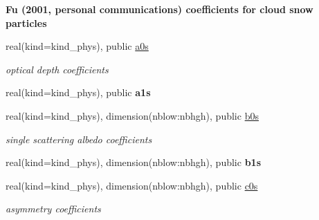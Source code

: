 \begin{Indent}\textbf{ Fu (2001, personal communications) coefficients for cloud snow particles}\par
\begin{DoxyCompactItemize}
\item 
\mbox{\label{namespacemodule__radsw__cldprtb_a81ba576e28e5844772d040ff7543faae}} 
real(kind=kind\+\_\+phys), public \hyperlink{namespacemodule__radsw__cldprtb_a81ba576e28e5844772d040ff7543faae}{a0s}
\begin{DoxyCompactList}\small\item\em optical depth coefficients \end{DoxyCompactList}\item 
\mbox{\label{namespacemodule__radsw__cldprtb_a9bf8de06b96c5014ca7f21fd39d84257}} 
real(kind=kind\+\_\+phys), public {\bfseries a1s}
\item 
\mbox{\label{namespacemodule__radsw__cldprtb_a391fbdda62f6fba95e105c2041e16880}} 
real(kind=kind\+\_\+phys), dimension(nblow\+:nbhgh), public \hyperlink{namespacemodule__radsw__cldprtb_a391fbdda62f6fba95e105c2041e16880}{b0s}
\begin{DoxyCompactList}\small\item\em single scattering albedo coefficients \end{DoxyCompactList}\item 
\mbox{\label{namespacemodule__radsw__cldprtb_a2d2296e76fb85b66bd4583bcb9fa271b}} 
real(kind=kind\+\_\+phys), dimension(nblow\+:nbhgh), public {\bfseries b1s}
\item 
\mbox{\label{namespacemodule__radsw__cldprtb_aab7693c5f31ce2182bca61aff77996bc}} 
real(kind=kind\+\_\+phys), dimension(nblow\+:nbhgh), public \hyperlink{namespacemodule__radsw__cldprtb_aab7693c5f31ce2182bca61aff77996bc}{c0s}
\begin{DoxyCompactList}\small\item\em asymmetry coefficients \end{DoxyCompactList}\end{DoxyCompactItemize}
\end{Indent}
